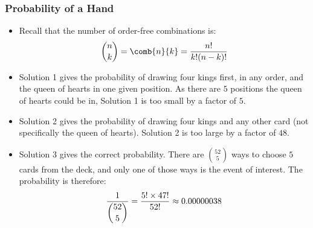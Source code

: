 

\begin{frame}
\frametitle{Probability of a Hand}
\begin{itemize}
\item Recall that the number of order-free combinations is:
\begin{align*}
\binom{n}{k} = \comb{n}{k} = \frac{n!}{k!(n-k)!}
\end{align*}
\item Solution 1 gives the probability of drawing four kings first, in any order, and the queen of hearts in one given position. As there are $5$ positions the queen of hearts could be in, Solution 1 is too small by a factor of $5$. 
\item Solution 2 gives the probability of drawing four kings and any other card (not specifically the queen of hearts). Solution 2 is too large by a factor of $48$.
\item Solution 3 gives the correct probability.
There are $\binom{52}{5}$ ways to choose $5$ cards from the deck, and only one of those ways is the event of interest. The probability is therefore:
\begin{align*}
\frac{1}{\dbinom{52}{5}} 
= \frac{5! \times 47!}{52!}
\approx 0.00000038
\end{align*}
\end{itemize}
\end{frame}


